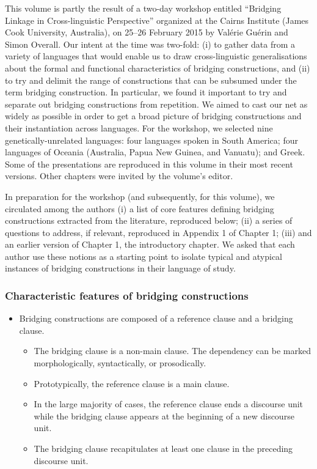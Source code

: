 \begin{refsection}


This volume is partly the result of a two-day workshop entitled ``Bridging Linkage in Cross-linguistic Perspective'' organized at the Cairns Institute (James Cook University, Australia), on 25--26 February 2015 by Valérie Guérin and Simon Overall. Our intent at the time was two-fold: (i) to gather data from a variety of languages that would enable us to draw cross-linguistic generalisations about the formal and functional characteristics of bridging constructions, and (ii) to try and delimit the range of constructions that can be subsumed under the term bridging construction. In particular, we found it important to try and separate out bridging constructions from repetition. We aimed to cast our net as widely as possible in order to get a broad picture of bridging constructions and their instantiation across languages. For the workshop, we selected  nine genetically-unrelated languages: four languages spoken in South America; four languages of Oceania (Australia, Papua New Guinea, and Vanuatu); and Greek. Some of the presentations are reproduced in this volume in their most recent versions. Other chapters were invited by the volume’s editor. 

In preparation for the workshop (and subsequently, for this volume), we circulated among the authors (i) a list of core features defining bridging constructions extracted from the literature, reproduced below; (ii) a series of questions to address, if relevant, reproduced in Appendix 1 of Chapter 1; (iii) and an earlier version of Chapter 1, the introductory chapter. We asked that each author use these notions as a starting point to isolate typical and atypical instances of bridging constructions in their language of study. 



\subsubsection*{Characteristic features of bridging constructions}


\begin{itemize}
\item Bridging constructions are composed of a reference clause and a bridging clause. 
   \begin{itemize}
   \item The bridging clause is a non-main clause. The dependency can be marked morphologically, syntactically, or prosodically.
   \item  Prototypically, the reference clause is a main clause. 
   \item In the large majority of cases, the reference clause ends a discourse unit while the bridging clause appears at the beginning of a new discourse unit.
   \item  The bridging clause recapitulates at least one clause in the preceding discourse unit. 
   \end{itemize}
   \end{itemize}
   

\end{refsection}
